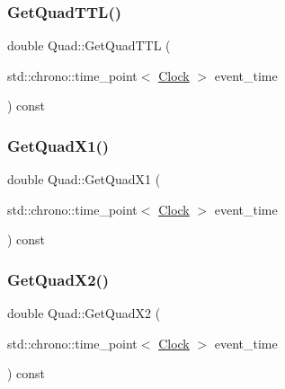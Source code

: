 \mbox{\label{classQuad_ab17ff4d689675e80107ecf6588811eee}} 
\subsubsection{\texorpdfstring{Get\+Quad\+T\+T\+L()}{GetQuadTTL()}}
{\footnotesize\ttfamily double Quad\+::\+Get\+Quad\+T\+TL (\begin{DoxyParamCaption}\item[{std\+::chrono\+::time\+\_\+point$<$ \mbox{\hyperlink{universe_8h_a0ef8d951d1ca5ab3cfaf7ab4c7a6fd80}{Clock}} $>$}]{event\+\_\+time }\end{DoxyParamCaption}) const\hspace{0.3cm}{\ttfamily [inline]}}

\mbox{\label{classQuad_a7b0e34a18832713528b861f7ed35e139}} 
\subsubsection{\texorpdfstring{Get\+Quad\+X1()}{GetQuadX1()}}
{\footnotesize\ttfamily double Quad\+::\+Get\+Quad\+X1 (\begin{DoxyParamCaption}\item[{std\+::chrono\+::time\+\_\+point$<$ \mbox{\hyperlink{universe_8h_a0ef8d951d1ca5ab3cfaf7ab4c7a6fd80}{Clock}} $>$}]{event\+\_\+time }\end{DoxyParamCaption}) const\hspace{0.3cm}{\ttfamily [inline]}}

\mbox{\label{classQuad_a2974623eaf17fe5bef35e8c4638149d6}} 
\subsubsection{\texorpdfstring{Get\+Quad\+X2()}{GetQuadX2()}}
{\footnotesize\ttfamily double Quad\+::\+Get\+Quad\+X2 (\begin{DoxyParamCaption}\item[{std\+::chrono\+::time\+\_\+point$<$ \mbox{\hyperlink{universe_8h_a0ef8d951d1ca5ab3cfaf7ab4c7a6fd80}{Clock}} $>$}]{event\+\_\+time }\end{DoxyParamCaption}) const\hspace{0.3cm}{\ttfamily [inline]}}

